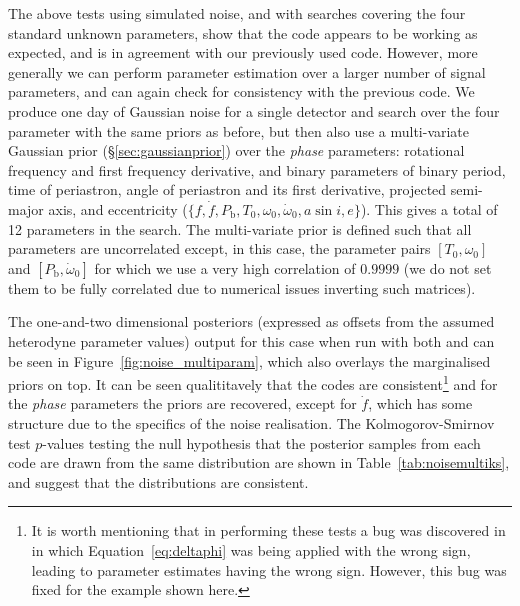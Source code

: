 The above tests using simulated noise, and with searches covering the four standard unknown \gw parameters, show that the code appears to
be working as expected, and is in agreement with our previously used code. However, more generally we can perform parameter estimation
over a larger number of signal parameters, and can again check for consistency with the previous code. We produce one day of Gaussian
noise for a single detector and search over the four \gw parameter with the same priors as before, but then also use a multi-variate Gaussian prior (\S\ref{sec:gaussianprior})
over the {\it phase} parameters: rotational frequency and first frequency derivative, and binary parameters of binary period, time of periastron, angle of
periastron and its first derivative, projected semi-major axis, and eccentricity ($\{f,\dot{f},P_{\text{b}}, T_0, \omega_0, \dot{\omega}_0, a\sin{i}, e\}$).
This gives a total of 12 parameters in the search. The multi-variate prior is defined such that all parameters are uncorrelated except, in this case,
the parameter pairs $[T_0, \omega_0]$ and $[P_{\text{b}}, \dot{\omega}_0]$ for which we use a very high correlation of $0.9999$ (we do not set them to
be fully correlated due to numerical issues inverting such matrices).

The one-and-two dimensional posteriors (expressed as offsets from the assumed heterodyne parameter values) output for this case when run with both
\lppe and \lppen can be seen in Figure~\ref{fig:noise_multiparam},
which also overlays the marginalised priors on top. It can be seen qualititavely that the codes are consistent\footnote{It is worth mentioning that in performing
these tests a bug was discovered in \lppe in which Equation~\ref{eq:deltaphi} was being applied with the wrong sign, leading to parameter estimates
having the wrong sign. However, this bug was fixed for the example shown here.} and for the {\it phase} parameters the priors are recovered, except for
$\dot{f}$, which has some structure due to the specifics of the noise realisation. The Kolmogorov-Smirnov test $p$-values testing the null hypothesis
that the posterior samples from each code are drawn from the same distribution are shown in Table~\ref{tab:noisemultiks}, and suggest that the
distributions are consistent.

